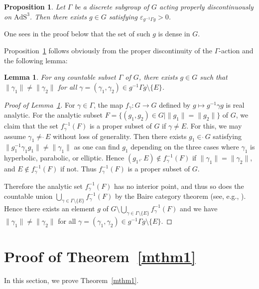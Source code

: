 \documentclass[pdftex]{sigma}
\numberwithin{equation}{section}
\newtheorem{Lemma}[Theorem]{Lemma}
\newtheorem{Proposition}[Theorem]{Proposition}
\begin{document}
\begin{Proposition}\label{strong}
Let $\Gamma$ be a discrete subgroup of $G$ acting properly discontinuously
on $\mathrm{AdS}^{3}$.
Then there exists $g \in G$
satisfying $\varepsilon_{g^{-1}\Gamma g} > 0$.
\end{Proposition}
\begin{Remark}
One sees in the proof below that
the set of such $g$ is dense in $G$.
\end{Remark}
Proposition~\ref{strong} follows obviously
from the proper discontinuity of the $\Gamma$-action and the following lemma:
\begin{Lemma}\label{weak}
For any countable subset $\Gamma$ of
$G$,
there exists
$g\in G$
such that $\|\gamma_1\|\neq\|\gamma_2\|$
for all $\gamma=(\gamma_1,\gamma_2)\in
g^{-1}\Gamma g \setminus \{E\}$.
\end{Lemma}

\begin{proof}[Proof of Lemma~\ref{weak}]
For $\gamma \in \Gamma$,
the map $f_{\gamma}\colon G \rightarrow G$ defined by $g\mapsto g^{-1}\gamma g$
is real analytic.
For the analytic subset
$F = \{(g_1,g_2) \in G
\mid \|g_1\| = \|g_2\| \}$ of $G$, we claim that
the set $f_{\gamma}^{-1}(F)$ is a proper subset of $G$ if $\gamma\neq E$.
For this, we may assume $\gamma_1 \neq \grave{\ }E$ without loss of generality.
Then there exists
$g_1 \in \grave{\ }G$ satisfying $\|g_1^{-1}\gamma_1g_1\| \neq \|
\gamma_1\|$ as one can find $g_{1}$ depending on the three cases where
$\gamma_{1}$ is hyperbolic, parabolic, or elliptic.
Hence $(g_1,\grave{\ }E)\notin f_{\gamma}^{-1}(F)$ if $\|\gamma_{1}\|=\|\gamma_{2}\|$,
and $E\notin f_{\gamma}^{-1}(F)$ if not. Thus $f_{\gamma}^{-1}(F)$ is a proper subset of $G$.

Therefore the analytic set
$f_{\gamma}^{-1}(F)$ has no interior point, and thus so does the countable union
$\bigcup_{\gamma \in \Gamma \setminus \{E\}}
 f_{\gamma}^{-1}(F)$ by the Baire category theorem
(see, e.g., \cite[Theorem~2.2]{functional-analysis}).
Hence there exists an element
$g$ of $G\setminus\bigcup_{\gamma \in \Gamma \setminus \{E\}}
 f_{\gamma}^{-1}(F)$ and we have
$\|\gamma_1\|\neq\|\gamma_2\|$
for all $\gamma=(\gamma_1,\gamma_2)\in
g^{-1}\Gamma g \setminus \{E\}$.
\end{proof}

\section{Proof of Theorem~\ref{mthm1}}\label{proof-linear-indep}
In this section, we prove Theorem~\ref{mthm1}.
\end{document}
